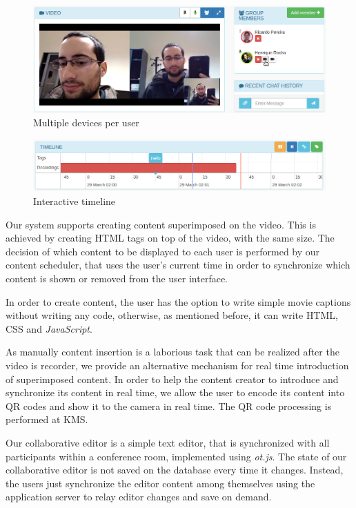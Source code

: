 \documentclass[10pt,conference]{IEEEtran}
\begin{document}
	\begin{figure}
		\centering
		\includegraphics[width=\linewidth]{figures/devices2.png}
		\caption{Multiple devices per user}
		\label{fig:devices}
	\end{figure}

	\begin{figure}
		\centering
		\includegraphics[width=\linewidth]{figures/timeline.png}
		\caption{Interactive timeline}
		\label{fig:timeline}
	\end{figure}




Our system supports creating content superimposed on the video.
This is achieved by creating \gls{HTML} tags on top of the video, with the same size.
The decision of which content to be displayed to each user is performed by our content scheduler, that uses the user's current time in order to synchronize which content is shown or removed from the user interface.

In order to create content, the user has the option to write simple movie captions without writing any code, otherwise, as mentioned before, it can write \gls{HTML}, \gls{CSS} and \emph{JavaScript}.

As manually content insertion is a laborious task that can be realized after the video is recorder, we provide an alternative mechanism for real time introduction of superimposed content.
In order to help the content creator to introduce and synchronize its content in real time, we allow the user to encode its content into \gls{QR} codes and show it to the camera in real time.
The \gls{QR} code processing is performed at \gls{KMS}.


Our collaborative editor is a simple text editor, that is synchronized with all participants within a conference room, implemented using \emph{ot.js}.
The state of our collaborative editor is not saved on the database every time it changes.
Instead, the users just synchronize the editor content among themselves using the application server to relay editor changes and save on demand.
\end{document}
